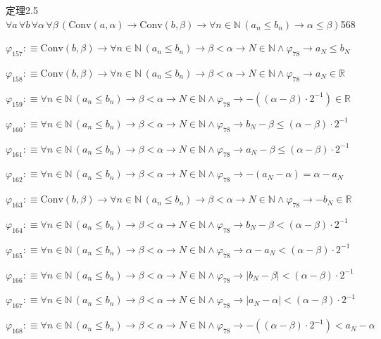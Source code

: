 \begin{fullproof}{定理2.5}{$\forall a\,\forall b\,\forall \alpha\,\forall \beta\,(\mathrm{Conv}(a,\alpha) \to \mathrm{Conv}(b,\beta) \to \forall n \in \mathbb{N}\,(a_{n} \leq b_{n}) \to \alpha \leq \beta)$}{568}
\begin{abbrevlist}
\item $\varphi_{157} :\equiv \mathrm{Conv}(b,\beta) \to \forall n \in \mathbb{N}\,(a_{n} \leq b_{n}) \to \beta < \alpha \to N \in \mathbb{N} \land \varphi_{78} \to a_{N} \leq b_{N}$
\item $\varphi_{158} :\equiv \mathrm{Conv}(b,\beta) \to \forall n \in \mathbb{N}\,(a_{n} \leq b_{n}) \to \beta < \alpha \to N \in \mathbb{N} \land \varphi_{78} \to a_{N} \in \mathbb{R}$
\item $\varphi_{159} :\equiv \forall n \in \mathbb{N}\,(a_{n} \leq b_{n}) \to \beta < \alpha \to N \in \mathbb{N} \land \varphi_{78} \to -((\alpha - \beta) \cdot 2^{-1}) \in \mathbb{R}$
\item $\varphi_{160} :\equiv \forall n \in \mathbb{N}\,(a_{n} \leq b_{n}) \to \beta < \alpha \to N \in \mathbb{N} \land \varphi_{78} \to b_{N} - \beta \leq (\alpha - \beta) \cdot 2^{-1}$
\item $\varphi_{161} :\equiv \forall n \in \mathbb{N}\,(a_{n} \leq b_{n}) \to \beta < \alpha \to N \in \mathbb{N} \land \varphi_{78} \to a_{N} - \beta \leq (\alpha - \beta) \cdot 2^{-1}$
\item $\varphi_{162} :\equiv \forall n \in \mathbb{N}\,(a_{n} \leq b_{n}) \to \beta < \alpha \to N \in \mathbb{N} \land \varphi_{78} \to -(a_{N} - \alpha) = \alpha - a_{N}$
\item $\varphi_{163} :\equiv \mathrm{Conv}(b,\beta) \to \forall n \in \mathbb{N}\,(a_{n} \leq b_{n}) \to \beta < \alpha \to N \in \mathbb{N} \land \varphi_{78} \to -b_{N} \in \mathbb{R}$
\item $\varphi_{164} :\equiv \forall n \in \mathbb{N}\,(a_{n} \leq b_{n}) \to \beta < \alpha \to N \in \mathbb{N} \land \varphi_{78} \to b_{N} - \beta < (\alpha - \beta) \cdot 2^{-1}$
\item $\varphi_{165} :\equiv \forall n \in \mathbb{N}\,(a_{n} \leq b_{n}) \to \beta < \alpha \to N \in \mathbb{N} \land \varphi_{78} \to \alpha - a_{N} < (\alpha - \beta) \cdot 2^{-1}$
\item $\varphi_{166} :\equiv \forall n \in \mathbb{N}\,(a_{n} \leq b_{n}) \to \beta < \alpha \to N \in \mathbb{N} \land \varphi_{78} \to \lvert b_{N} - \beta \rvert < (\alpha - \beta) \cdot 2^{-1}$
\item $\varphi_{167} :\equiv \forall n \in \mathbb{N}\,(a_{n} \leq b_{n}) \to \beta < \alpha \to N \in \mathbb{N} \land \varphi_{78} \to \lvert a_{N} - \alpha \rvert < (\alpha - \beta) \cdot 2^{-1}$
\item $\varphi_{168} :\equiv \forall n \in \mathbb{N}\,(a_{n} \leq b_{n}) \to \beta < \alpha \to N \in \mathbb{N} \land \varphi_{78} \to -((\alpha - \beta) \cdot 2^{-1}) < a_{N} - \alpha$

\end{abbrevlist}
\end{fullproof}
